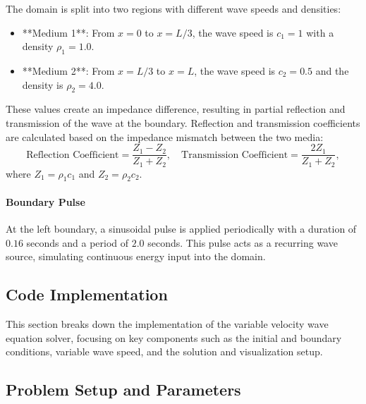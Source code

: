 \documentclass{article}
\begin{document}
		The domain is split into two regions with different wave speeds and densities:
		\begin{itemize}
			\item **Medium 1**: From \( x = 0 \) to \( x = L/3 \), the wave speed is \( c_1 = 1 \) with a density \( \rho_1 = 1.0 \).
			\item **Medium 2**: From \( x = L/3 \) to \( x = L \), the wave speed is \( c_2 = 0.5 \) and the density is \( \rho_2 = 4.0 \).
		\end{itemize}
		
		These values create an impedance difference, resulting in partial reflection and transmission of the wave at the boundary. Reflection and transmission coefficients are calculated based on the impedance mismatch between the two media:
		\[
		\text{Reflection Coefficient} = \frac{Z_1 - Z_2}{Z_1 + Z_2}, \quad \text{Transmission Coefficient} = \frac{2 Z_1}{Z_1 + Z_2},
		\]
		where \( Z_1 = \rho_1 c_1 \) and \( Z_2 = \rho_2 c_2 \).
		
		\paragraph{Boundary Pulse}
		
		At the left boundary, a sinusoidal pulse is applied periodically with a duration of \( 0.16 \) seconds and a period of \( 2.0 \) seconds. This pulse acts as a recurring wave source, simulating continuous energy input into the domain.
		
		\subsection{Code Implementation}
		
		This section breaks down the implementation of the variable velocity wave equation solver, focusing on key components such as the initial and boundary conditions, variable wave speed, and the solution and visualization setup.
		
		\subsection{Problem Setup and Parameters}
		
\end{document}
